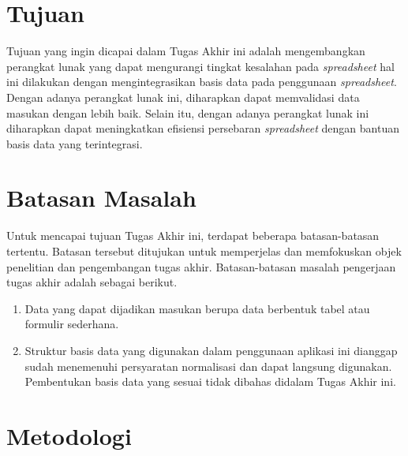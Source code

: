 \section{Tujuan}

Tujuan yang ingin dicapai dalam Tugas Akhir ini adalah mengembangkan perangkat lunak yang dapat mengurangi tingkat kesalahan pada \textit{spreadsheet} hal ini dilakukan dengan mengintegrasikan basis data pada penggunaan \textit{spreadsheet}. Dengan adanya perangkat lunak ini, diharapkan dapat memvalidasi data masukan dengan lebih baik. Selain itu, dengan adanya perangkat lunak ini diharapkan dapat meningkatkan efisiensi persebaran \textit{spreadsheet} dengan bantuan basis data yang terintegrasi.

\section{Batasan Masalah}

Untuk mencapai tujuan Tugas Akhir ini, terdapat beberapa batasan-batasan tertentu. Batasan tersebut ditujukan untuk memperjelas dan memfokuskan objek penelitian dan pengembangan tugas akhir. Batasan-batasan masalah pengerjaan tugas akhir adalah sebagai berikut.

\begin{enumerate}
    \item Data yang dapat dijadikan masukan berupa data berbentuk tabel atau formulir sederhana.
    \item Struktur basis data yang digunakan dalam penggunaan aplikasi ini dianggap sudah menemenuhi persyaratan normalisasi dan dapat langsung digunakan. Pembentukan basis data yang sesuai tidak dibahas didalam Tugas Akhir ini.
\end{enumerate}

\section{Metodologi}

